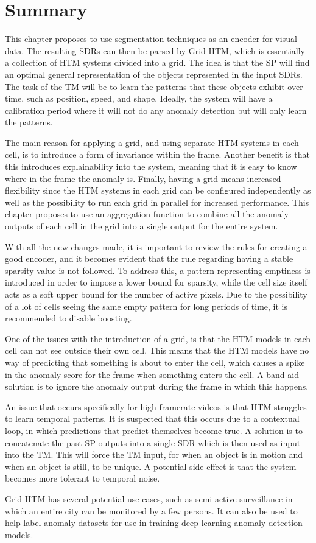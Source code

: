 \section{Summary}
This chapter proposes to use segmentation techniques as an encoder for visual data. The resulting SDRs can then be parsed by Grid HTM, which is essentially a collection of HTM systems divided into a grid. The idea is that the SP will find an optimal general representation of the objects represented in the input SDRs. The task of the TM will be to learn the patterns that these objects exhibit over time, such as position, speed, and shape. Ideally, the system will have a calibration period where it will not do any anomaly detection but will only learn the patterns.
\par
The main reason for applying a grid, and using separate HTM systems in each cell, is to introduce a form of invariance within the frame. Another benefit is that this introduces explainability into the system, meaning that it is easy to know where in the frame the anomaly is. Finally, having a grid means increased flexibility since the HTM systems in each grid can be configured independently as well as the possibility to run each grid in parallel for increased performance. This chapter proposes to use an aggregation function to combine all the anomaly outputs of each cell in the grid into a single output for the entire system.
\par
With all the new changes made, it is important to review the rules for creating a good encoder, and it becomes evident that the rule regarding having a stable sparsity value is not followed. To address this, a pattern representing emptiness is introduced in order to impose a lower bound for sparsity, while the cell size itself acts as a soft upper bound for the number of active pixels. Due to the possibility of a lot of cells  seeing the same empty pattern for long periods of time, it is recommended to disable boosting.
\par
One of the issues with the introduction of a grid, is that the HTM models in each cell can not see outside their own cell. This means that the HTM models have no way of predicting that something is about to enter the cell, which causes a spike in the anomaly score for the frame when something enters the cell. A band-aid solution is to ignore the anomaly output during the frame in which this happens.
\par
An issue that occurs specifically for high framerate videos is that HTM struggles to learn temporal patterns. It is suspected that this occurs due to a contextual loop, in which predictions that predict themselves become true. A solution is to concatenate the past SP outputs into a single SDR which is then used as input into the TM. This will force the TM input, for when an object is in motion and when an object is still, to be unique. A potential side effect is that the system becomes more tolerant to temporal noise.
\par
Grid HTM has several potential use cases, such as semi-active surveillance in which an entire city can be monitored by a few persons. It can also be used to help label anomaly datasets for use in training deep learning anomaly detection models.